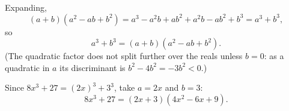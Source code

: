 Expanding,
\[
(a+b)(a^2-ab+b^2)=a^3-a^2b+ab^2+a^2b-ab^2+b^3=a^3+b^3 ,
\]
so
\[
a^3+b^3=(a+b)(a^2-ab+b^2).
\]
(The quadratic factor does not split further over the reals unless $b=0$: as a quadratic in $a$ its discriminant is $b^2-4b^2=-3b^2<0$.)

Since $8x^3+27=(2x)^3+3^3$, take $a=2x$ and $b=3$:
\[
8x^3+27=\boxed{(2x+3)(4x^2-6x+9)} .
\]
